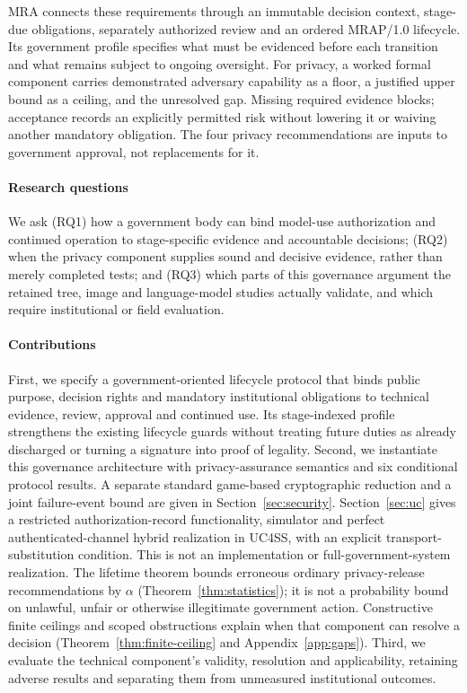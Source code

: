 \documentclass[conference,compsoc]{IEEEtran}
\begin{document}
MRA connects these requirements through an immutable decision context,
stage-due obligations, separately authorized review and an ordered
MRAP/1.0 lifecycle. Its government profile specifies what must be evidenced
before each transition and what remains subject to ongoing oversight.
For privacy, a worked formal component carries demonstrated adversary
capability as a floor, a justified upper bound as a ceiling, and the unresolved
gap. Missing required evidence blocks; acceptance records an explicitly
permitted risk without lowering it or waiving another mandatory obligation.
The four privacy recommendations are inputs to government approval,
not replacements for it.

\paragraph{Research questions}
We ask (RQ1) how a government body can bind model-use authorization and
continued operation to stage-specific evidence and accountable decisions;
(RQ2) when the privacy component supplies sound and decisive evidence,
rather than merely completed tests; and (RQ3) which parts of this governance
argument the retained tree, image and language-model studies actually
validate, and which require institutional or field evaluation.

\paragraph{Contributions}
First, we specify a government-oriented lifecycle protocol that binds public
purpose, decision rights and mandatory institutional obligations to
technical evidence, review, approval and continued use. Its stage-indexed
profile strengthens the existing lifecycle guards without treating future
duties as already discharged or turning a signature into proof of legality.
Second, we instantiate this governance architecture with privacy-assurance
semantics and six conditional protocol results. A separate standard
game-based cryptographic reduction and a joint failure-event bound are given in
Section~\ref{sec:security}. Section~\ref{sec:uc} gives a restricted
authorization-record functionality, simulator and perfect authenticated-channel
hybrid realization in UC4SS, with an explicit transport-substitution condition.
This is not an implementation or full-government-system realization.
The lifetime theorem bounds erroneous
ordinary privacy-release recommendations by $\alpha$
(Theorem~\ref{thm:statistics}); it is not a probability bound on unlawful,
unfair or otherwise illegitimate government action. Constructive finite
ceilings and scoped obstructions explain when that component can resolve a
decision (Theorem~\ref{thm:finite-ceiling} and Appendix~\ref{app:gaps}).
Third, we evaluate the technical component's validity, resolution and
applicability, retaining adverse results and separating them from
unmeasured institutional outcomes.
\end{document}
